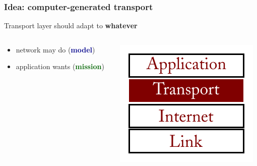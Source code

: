 \documentclass[svgnames]{beamer}
\begin{document}
\begin{frame}
\frametitle{\textbf{Idea}: computer-generated transport}

\Large Transport layer should adapt to \textbf{whatever}

\begin{columns}

\begin{column}{0.66 \textwidth}

\begin{itemize}
\item network may do (\textbf{\textcolor{DarkBlue}{model}})

\item application wants (\textbf{\textcolor{DarkGreen}{mission}})

\end{itemize}

\end{column}

\begin{column}{0.33\textwidth}

\includegraphics[width=\textwidth]{transport.pdf}

\end{column}

\end{columns}

\end{frame}
\end{document}
